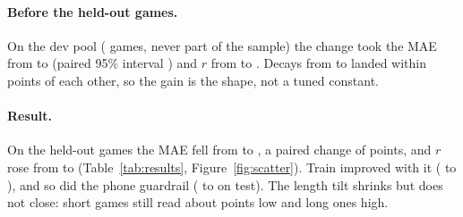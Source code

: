 \documentclass[11pt]{article}
\begin{document}
\paragraph{Before the held-out games.} On the dev pool (\DevPool{} games, never part of the
sample) the change took the MAE from \DevMaeBefore{} to \DevMaeAfter{} (paired 95\% interval
\DevCI) and $r$ from \DevRBefore{} to \DevRAfter. Decays from \DecayLow{} to \DecayHigh{} landed
within \DecaySpread{} points of each other, so the gain is the shape, not a tuned constant.

\paragraph{Result.} On the held-out games the MAE fell from \BaseTestMaeCI{} to \OneTestMaeCI,
a paired change of \OneVsBase{} points, and $r$ rose from \BaseTestRCI{} to \OneTestRCI{}
(Table~\ref{tab:results}, Figure~\ref{fig:scatter}). Train improved with it (\BaseTrainMae{} to
\OneTrainMae), and so did the phone guardrail (\PhoneBaseTestMae{} to \PhoneOneTestMae{} on
test). The length tilt shrinks but does not close: short games still read about
\TiltTwoShort{} points low and long ones \TiltTwoLong{} high.

\begin{table}[!htbp]
\centering\footnotesize
\setlength{\tabcolsep}{4pt}
\AggregateTable
\caption{Each instrument against chess.com, with 95\% bootstrap intervals over games. Every column
but the train MAE is on the held-out games. MAE and bias in accuracy points, the app's less
chess.com's; the last column is the change in test MAE from the baseline, paired on the same
games.}
\label{tab:results}
\end{table}
\end{document}
